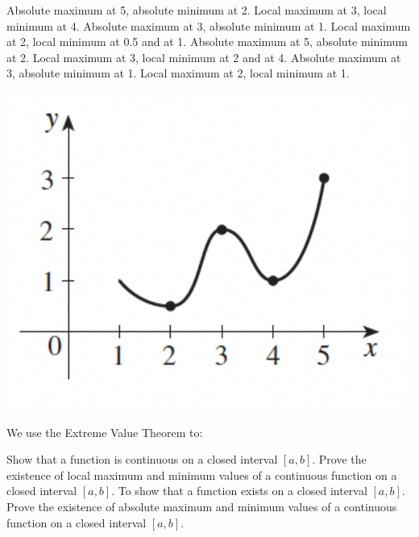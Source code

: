 \documentclass[addpoints, 12pt]{exam}%
\begin{document}
\begin{questions}
\begin{minipage}{0.5\textwidth}
\begin{choices}
\choice Absolute maximum at 5, absolute minimum at 2. Local maximum at 3, local minimum at 4.\vspace*{10pt}
\choice Absolute maximum at 3, absolute minimum at 1. Local maximum at 2, local minimum at 0.5 and at 1.\vspace*{10pt}
\CorrectChoice Absolute maximum at 5, absolute minimum at 2. Local maximum at 3, local minimum at 2 and at 4.\vspace*{10pt}
\choice Absolute maximum at 3, absolute minimum at 1. Local maximum at 2, local minimum at 1.\vspace*{10pt}
\end{choices}
\end{minipage}
\hspace*{1cm}
\begin{minipage}{0.35\textwidth}
\includegraphics[width=1\textwidth]{HW4-graph.png}
\end{minipage}

\question[1]

We use the Extreme Value Theorem to:

\begin{choices}
\choice Show that a function is continuous on a closed interval $[a, b]$. 
\choice Prove the existence of local maximum and minimum values of a continuous function on a closed interval $[a, b]$.
\choice To show that a function exists on a closed interval $[a, b]$.
\CorrectChoice Prove the existence of absolute maximum and minimum values of a continuous function on a closed interval $[a, b]$.
\end{choices}


\end{questions}
\end{document}
